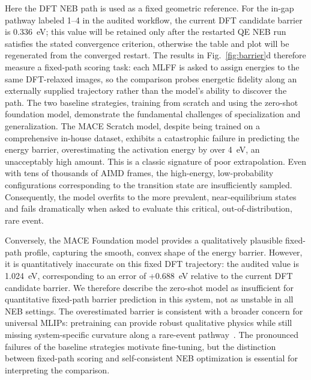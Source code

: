 \documentclass[pdflatex,sn-mathphys-num]{sn-jnl}%
\providecommand{\reviewermap}[3]{}
\theoremstyle{thmstyleone}%
\theoremstyle{thmstyletwo}%
\theoremstyle{thmstylethree}%
\begin{document}
\reviewermap{REV-A1}{partial}{Fig. 3d is fixed-geometry DFT-path scoring; current 1-4 DFT reference candidate is 0.336050 eV; Foundation fixed-path error is +0.688246 eV.}
Here the DFT NEB path is used as a fixed geometric reference. For the in-gap pathway labeled 1--4 in the audited workflow, the current DFT candidate barrier is 0.336~eV; this value will be retained only after the restarted QE NEB run satisfies the stated convergence criterion, otherwise the table and plot will be regenerated from the converged restart. The results in Fig.~\ref{fig:barrier}d therefore measure a fixed-path scoring task: each MLFF is asked to assign energies to the same DFT-relaxed images, so the comparison probes energetic fidelity along an externally supplied trajectory rather than the model's ability to discover the path.
The two baseline strategies, training from scratch and using the zero-shot foundation model, demonstrate the fundamental challenges of specialization and generalization. The MACE Scratch model, despite being trained on a comprehensive in-house dataset, exhibits a catastrophic failure in predicting the energy barrier, overestimating the activation energy by over 4~eV, an unacceptably high amount. This is a classic signature of poor extrapolation. Even with tens of thousands of AIMD frames, the high-energy, low-probability configurations corresponding to the transition state are insufficiently sampled. Consequently, the model overfits to the more prevalent, near-equilibrium states and fails dramatically when asked to evaluate this critical, out-of-distribution, rare event.

Conversely, the MACE Foundation model provides a qualitatively plausible fixed-path profile, capturing the smooth, convex shape of the energy barrier. However, it is quantitatively inaccurate on this fixed DFT trajectory: the audited value is 1.024~eV, corresponding to an error of +0.688~eV relative to the current DFT candidate barrier. We therefore describe the zero-shot model as insufficient for quantitative fixed-path barrier prediction in this system, not as unstable in all NEB settings. The overestimated barrier is consistent with a broader concern for universal MLIPs: pretraining can provide robust qualitative physics while still missing system-specific curvature along a rare-event pathway~\citep{deng2025softening}. The pronounced failures of the baseline strategies motivate fine-tuning, but the distinction between fixed-path scoring and self-consistent NEB optimization is essential for interpreting the comparison.
\end{document}
